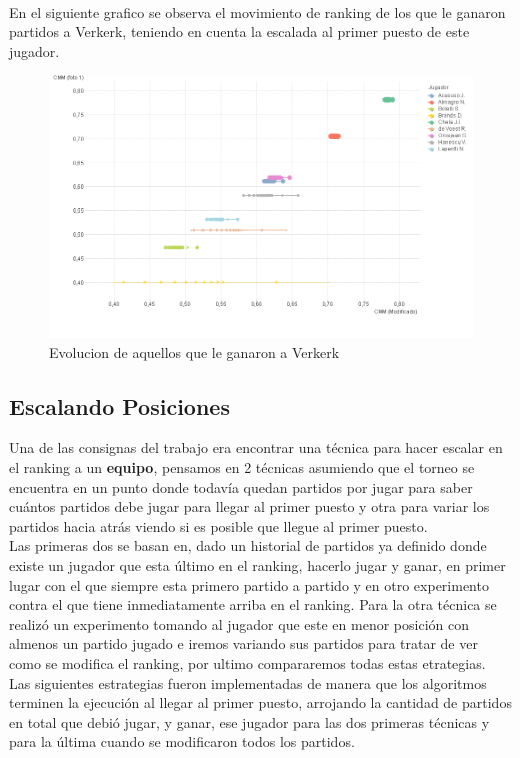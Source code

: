 \\
En el siguiente grafico se observa el movimiento de ranking de los que le ganaron partidos a Verkerk, teniendo en cuenta la escalada al primer puesto de este jugador.
\\
\begin{figure}[H]
    \centering
    \includegraphics[width=1\textwidth]{IMG/partidos jugados vs verkerk grafico.png}
    \caption{Evolucion de aquellos que le ganaron a Verkerk}
    \label{fig:Evolucion de aquellos que le ganaron a Verkerk}
\end{figure}

\subsection{Escalando Posiciones}

Una de las consignas del trabajo era encontrar una técnica para hacer escalar en el ranking a un \textbf{equipo}, pensamos en 2 técnicas asumiendo que el torneo se encuentra en un punto donde todavía quedan partidos por jugar para saber cuántos partidos debe jugar para llegar al primer puesto y otra para variar los partidos hacia atrás viendo si es posible que llegue al primer puesto.
\\
Las primeras dos se basan en, dado un historial de partidos ya definido donde existe un jugador que esta último en el ranking, hacerlo jugar y ganar, en primer lugar con el que siempre esta primero partido a partido y en otro experimento contra el que tiene inmediatamente arriba en el ranking. Para la otra técnica se realizó un experimento tomando al jugador que este en menor posición con almenos un partido jugado e iremos variando sus partidos para tratar de ver como se modifica el ranking, por ultimo compararemos todas estas etrategias.
\\
Las siguientes estrategias fueron implementadas de manera que los algoritmos terminen la ejecución al llegar al primer puesto, arrojando la cantidad de partidos en total que debió jugar, y ganar, ese jugador para las dos primeras técnicas y para la última cuando se modificaron todos los partidos.

